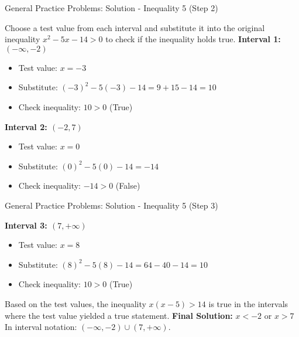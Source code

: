 \documentclass[aspectratio=169]{beamer}
\begin{document}
\begin{frame}{General Practice Problems: Solution - Inequality 5 (Step 2)}
    \begin{tcolorbox}[colback=lightgray,colframe=accent,title=Solution: $x(x-5) > 14$ (Step 2 - Use Test Values)]
        \footnotesize
        Choose a test value from each interval and substitute it into the original inequality $x^2 - 5x - 14 > 0$ to check if the inequality holds true.
        \newline
        \textbf{Interval 1: $(-\infty, -2)$}
        \begin{itemize}
            \item Test value: $x=-3$
            \item Substitute: $(-3)^2 - 5(-3) - 14 = 9 + 15 - 14 = 10$
            \item Check inequality: $10 > 0$ (True)
        \end{itemize}
        \newline
        \textbf{Interval 2: $(-2, 7)$}
        \begin{itemize}
            \item Test value: $x=0$
            \item Substitute: $(0)^2 - 5(0) - 14 = -14$
            \item Check inequality: $-14 > 0$ (False)
        \end{itemize}
    \end{tcolorbox}
\end{frame}

\begin{frame}{General Practice Problems: Solution - Inequality 5 (Step 3)}
    \begin{tcolorbox}[colback=lightgray,colframe=accent,title=Solution: $x(x-5) > 14$ (Step 3 - Final Solution)]
        \footnotesize
        \textbf{Interval 3: $(7, +\infty)$}
        \begin{itemize}
            \item Test value: $x=8$
            \item Substitute: $(8)^2 - 5(8) - 14 = 64 - 40 - 14 = 10$
            \item Check inequality: $10 > 0$ (True)
        \end{itemize}
        \newline
        Based on the test values, the inequality $x(x-5) > 14$ is true in the intervals where the test value yielded a true statement.
        \newline
        \textbf{Final Solution:} $x < -2$ or $x > 7$
        \newline
        In interval notation: $(-\infty, -2) \cup (7, +\infty)$.
    \end{tcolorbox}
\end{frame}
\end{document}
